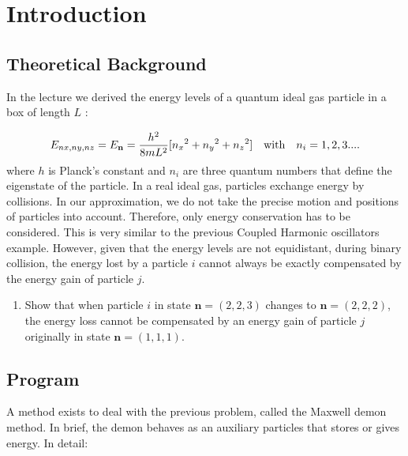 \documentclass[10pt]{article}
\begin{document}
\maketitle
\pagebreak
\section{Introduction}
\subsection{Theoretical Background \cite{IMSSS}}

In the lecture we derived the energy levels of a quantum ideal gas particle in a box of length $L$ :


\begin{equation} %
   E_{nx,ny,nz}=E_{\bf{n}}=\frac{h^2}{8mL^2}[{n_x}^2+{n_y}^2+{n_z}^2]\quad \text{with}\quad n_i=1,2,3....
   \label{equation:1.1} 
\end{equation}
% 
where $h$ is Planck’s constant and $n_i$ are three quantum numbers that define the eigenstate of the particle. In a real ideal gas, particles exchange energy by collisions. In our approximation, we do not take the precise motion and positions of particles into account. Therefore, only energy conservation has to be considered. This is very similar to the previous Coupled Harmonic oscillators example. However, given that the energy levels are not equidistant, during binary collision, the energy lost by a particle $i$ cannot always be exactly compensated by the energy gain of particle $j$.

\begin{enumerate}

\item Show that when particle $i$ in state $\bm{n}=(2,2,3)$ changes to  $\bm{n}=(2,2,2)$, the energy loss cannot be compensated by an energy gain of particle $j$ originally in state $\bm{n}=(1,1,1)$.

\end{enumerate}  



\subsection{Program}

A method exists to deal with the previous problem, called the Maxwell demon method\cite{Demon,STP}. In brief, the demon behaves as an auxiliary particles that stores or gives energy. In detail:
\end{document}
